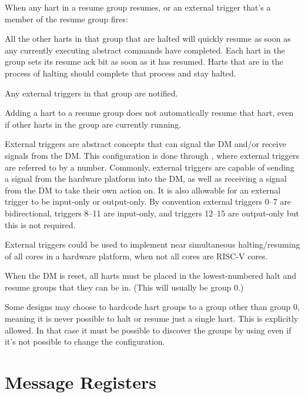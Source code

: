 \begin{steps}{When any hart in a resume group resumes, or an external trigger
    that's a member of the resume group fires:}
\item All the other harts in that group that are halted will quickly resume as
    soon as any currently executing abstract commands have completed.
    Each hart in the group sets its resume ack bit as soon as it has resumed.
    Harts that are in the process of halting should complete that process and stay
    halted.
\item Any external triggers in that group are notified.
\end{steps}
Adding a hart to a resume group does not automatically resume that hart, even
if other harts in the group are currently running.

External triggers are abstract concepts that can signal the DM and/or receive
signals from the DM. This configuration is done through \RdmDmcsTwo, where
external triggers are referred to by a number. Commonly, external triggers
are capable of sending a signal from the hardware platform into the DM, as well as
receiving a signal from the DM to take their own action on. It is also
allowable for an external trigger to be input-only or output-only. By
convention external triggers 0--7 are bidirectional, triggers 8--11 are
input-only, and triggers 12--15 are output-only but this is not required.

\begin{commentary}
    External triggers could be used to implement near simultaneous
    halting/resuming of all cores in a hardware platform, when not all cores are RISC-V
    cores.
\end{commentary}

When the DM is reset, all harts must be placed in the lowest-numbered halt and
resume groups that they can be in. (This will usually be group 0.)

Some designs may choose to hardcode hart groups to a group other than group 0,
meaning it is never possible to halt or resume just a single hart. This is
explicitly allowed. In that case it must be possible to discover the groups by
using \RdmDmcsTwo even if it's not possible to change the configuration.

\section{Message Registers}
\label{sec:mr}

